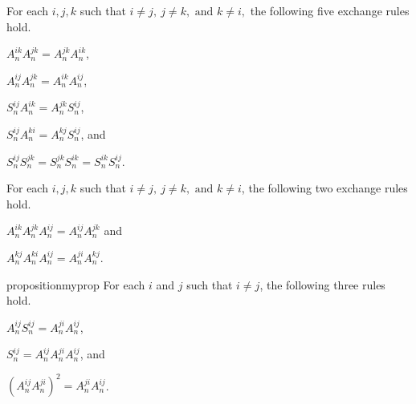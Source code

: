 \begin{proposition}
	For each $ i,j,k $ such that $ i\neq j,\ j\neq k, \text{ and } k\neq i, $ the following five exchange rules hold.
	
	\begin{enumerate*}[label=(\roman*),itemjoin={\quad}]
		\item $ A_n^{ik}A_n^{jk}=A_n^{jk}A_n^{ik} $,
		\item $ A_n^{ij}A_n^{jk}=A_n^{ik}A_n^{ij} $,
		\item $ S_n^{ij}A_n^{ik}=A_n^{jk}S_n^{ij} $,
		\item $ S_n^{ij}A_n^{ki}=A_n^{kj}S_n^{ij} $, and
		\item $ S_n^{ij}S_n^{jk}=S_n^{jk}S_n^{ik}=S_n^{ik}S_n^{ij} $.
	\end{enumerate*}
\end{proposition}

\begin{proposition}
	For each $ i,j,k $ such that $ i\neq j,\ j\neq k, \text{ and } k\neq i $, the following two exchange rules hold.
	
	\begin{enumerate*}[label=(\roman*),itemjoin={\quad}]
		\item $ A_n^{ik}A_n^{jk}A_n^{ij}=A_n^{ij} A_n^{jk} $ and
		\item $ A_n^{kj}A_n^{ki}A_n^{ij}=A_n^{ji}A_n^{kj} $.
	\end{enumerate*}
\end{proposition}


\begin{restatable}{proposition}{myprop}
	\label{prop:myprop}
	For each $ i $ and $ j $ such that $ i\neq j $, the following three rules hold.
	
	\begin{enumerate*}[label=(\roman*),itemjoin={\quad}]
		\item $ A_n^{ij}S_n^{ij}=A_n^{ji}A_n^{ij} $,
		\item $ S_n^{ij}=A_n^{ij}A_n^{ji}A_n^{ij} $, and
		\item $ \left(A_n^{ij}A_n^{ji}\right)^2=A_n^{ji}A_n^{ij} $.
	\end{enumerate*}
\end{restatable}





